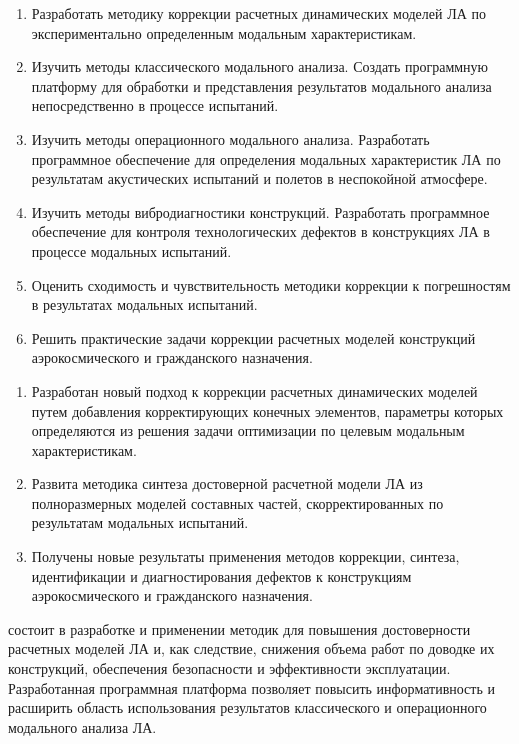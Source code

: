 {\tasks}
\begin{enumerate}[beginpenalty = 10000] 
	\item Разработать методику коррекции расчетных динамических моделей ЛА по экспериментально определенным модальным характеристикам.
	\item Изучить методы классического модального анализа. Создать программную платформу для обработки и представления результатов модального анализа непосредственно в процессе испытаний. 
	\item Изучить методы операционного модального анализа. Разработать программное обеспечение для определения модальных характеристик ЛА по результатам акустических испытаний и полетов в неспокойной атмосфере.
	\item Изучить методы вибродиагностики конструкций. Разработать программное обеспечение для контроля технологических дефектов в конструкциях ЛА в процессе модальных испытаний. 
	\item Оценить сходимость и чувствительность методики коррекции к погрешностям в результатах модальных испытаний. 
	\item Решить практические задачи коррекции расчетных моделей конструкций аэрокосмического и гражданского назначения.
\end{enumerate}

{\novelty}
\begin{enumerate}[beginpenalty = 10000] 
	\item Разработан новый подход к коррекции расчетных динамических моделей путем добавления корректирующих конечных элементов, параметры которых определяются из решения задачи оптимизации по целевым модальным характеристикам.
	\item Развита методика синтеза достоверной расчетной модели ЛА из полноразмерных моделей составных частей, скорректированных по результатам модальных испытаний.
	\item Получены новые результаты применения методов коррекции, синтеза, идентификации и диагностирования дефектов к конструкциям аэрокосмического и гражданского назначения.
\end{enumerate}

{\influence} состоит в разработке и применении методик для повышения достоверности расчетных моделей ЛА и, как следствие, снижения объема работ по доводке их конструкций, обеспечения безопасности и эффективности эксплуатации. Разработанная программная платформа позволяет повысить информативность и расширить область использования результатов классического и операционного модального анализа ЛА.

